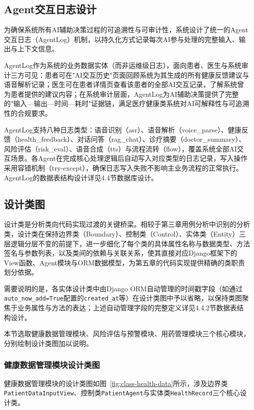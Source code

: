 \subsection{Agent交互日志设计}

为确保系统所有AI辅助决策过程的可追溯性与可审计性，系统设计了统一的Agent交互日志（AgentLog）机制，以持久化方式记录每次AI参与处理的完整输入、输出与上下文信息。

AgentLog作为系统的业务数据实体（而非运维级日志），面向患者、医生与系统审计三方可见：患者可在"AI交互历史"页面回顾系统为其生成的所有健康反馈建议与语音解析记录；医生可在患者详情页查看该患者的全部AI交互记录，了解系统曾为患者提供的建议内容；在系统审计层面，AgentLog为AI辅助决策提供了完整的"输入—输出—时间—耗时"证据链，满足医疗健康类系统对AI可解释性与可追溯性的合规要求。

AgentLog支持八种日志类型：语音识别（asr）、语音解析（voice\_parse）、健康反馈（health\_feedback）、对话问答（rag\_chat）、诊疗摘要（doctor\_summary）、风险评估（risk\_eval）、语音合成（tts）与流程流转（flow），覆盖系统全部AI交互场景。各Agent在完成核心处理逻辑后自动写入对应类型的日志记录，写入操作采用容错机制（try-except），确保日志写入失败不影响主业务流程的正常执行。AgentLog的数据表结构设计详见4.4节数据库设计。


\subsection{设计类图}

设计类是分析类向代码实现过渡的关键桥梁。相较于第三章用例分析中识别的分析类，设计类在保持边界类（Boundary）、控制类（Control）、实体类（Entity）三层逻辑分层不变的前提下，进一步细化了每个类的具体属性名称与数据类型、方法签名与参数列表，以及类间的依赖与关联关系，使其直接对应Django框架下的View函数、Agent模块与ORM数据模型，为第五章的代码实现提供精确的类职责划分依据。

需要说明的是，各实体设计类中由Django ORM自动管理的时间戳字段（如通过\texttt{auto\_now\_add=True}配置的\texttt{created\_at}等）在设计类图中予以省略，以保持类图聚焦于业务属性与方法的表达；上述自动管理字段的完整定义详见4.4.2节数据表结构设计。

本节选取健康数据管理模块、风险评估与预警模块、用药管理模块三个核心模块，分别绘制设计类图加以说明。


\subsubsection{健康数据管理模块设计类图}

健康数据管理模块的设计类图如图~\ref{fig:class-health-data}所示，涉及边界类\texttt{PatientDataInputView}、控制类\texttt{PatientAgent}与实体类\texttt{HealthRecord}三个核心设计类。

